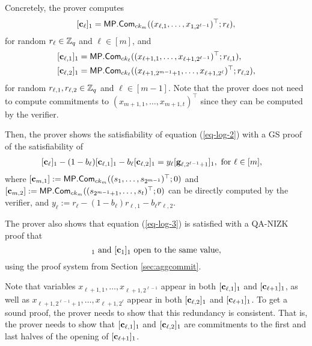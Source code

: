 Concretely, the prover computes
\begin{align*}
&[\mathbf{c}_\ell]_1=\mathsf{MP}.\mathsf{Com}_{ck_m}((x_{\ell,1},\ldots,x_{1,2^{\ell-1}})^\top;r_\ell),\\
\end{align*}
for random $r_\ell\in\mathbb{Z}_q$ and $\ell\in[m]$, and 
\begin{align*}
&[\mathbf{c}_{\ell,1}]_1=\mathsf{MP}.\mathsf{Com}_{ck_{\ell}}((x_{\ell+1,1},\ldots,x_{\ell+1,2^{\ell-1}})^\top;r_{\ell,1}),\\
&[\mathbf{c}_{\ell,2}]_1=\mathsf{MP}.\mathsf{Com}_{ck_{\ell}}((x_{\ell+1,2^{m-1}+1},\ldots,x_{\ell+1,2^\ell})^\top;r_{\ell,2}),\\
\end{align*}
for random $r_{\ell,1},r_{\ell,2}\in\mathbb{Z}_q$ and $\ell\in[m-1]$. Note that the prover does not need to compute commitments to $(x_{m+1,1},\ldots,x_{m+1,t})^\top$ since they can be computed by the verifier.

Then, the prover shows the satisfiability of equation (\ref{eq-log-2}) with a GS proof of
the satisfiability of
\begin{align}
&[\mathbf{c}_\ell]_1-(1-b_\ell)[\mathbf{c}_{\ell,1}]_1-b_\ell[\mathbf{c}_{\ell,2}]_1 = y_\ell[\mathbf{g}_{\ell,2^{\ell-1}+1}]_1, \text{ for } \ell \in[m],  \label{eq-log-5}
\end{align}
where $[\mathbf{c}_{m,1}]:=\mathsf{MP}.\mathsf{Com}_{ck_m}((s_1,\ldots,s_{2^{m-1}})^\top;0)$ and $[\mathbf{c}_{m,2}]:=\allowbreak \mathsf{MP}.\mathsf{Com}_{ck_m}(\allowbreak (s_{2^{m-1}+1},\allowbreak\ldots,s_{t})^\top;0)$ can be directly computed by the verifier, and $y_\ell:=r_\ell-(1-b_\ell)r_{\ell,1}-b_\ell r_{\ell,2}$.

The prover also shows that equation (\ref{eq-log-3}) is satisfied with a QA-NIZK proof that
\begin{equation}
[\vecb{c}]_1\text{ and }[\vecb{c}_1]_1\text{ open to the same value}, \label{eq-log-6}
\end{equation}
using the proof system from Section \ref{sec:aggcommit}.

Note that variables $x_{\ell+1,1},\ldots,x_{\ell+1,2^{\ell-1}}$ appear in both $[\mathbf{c}_{\ell,1}]_1$ and $[\mathbf{c}_{\ell+1}]_1$, as well as $x_{\ell+1,2^{\ell-1}+1},\ldots,x_{\ell+1,2^\ell}$ appear in both $[\mathbf{c}_{\ell,2}]_1$ and $[\mathbf{c}_{\ell+1}]_1$. To get a sound proof, the prover needs to show that this redundancy is consistent. That is, the prover needs to show that $[\mathbf{c}_{\ell,1}]_1$ and $[\mathbf{c}_{\ell,2}]_1$ are commitments to the first and last halves of the opening of $[\mathbf{c}_{\ell+1}]_1$.

